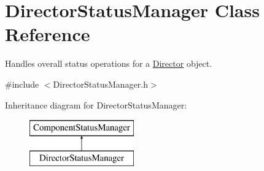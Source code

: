 \hypertarget{class_director_status_manager}{\section{Director\-Status\-Manager Class Reference}
\label{class_director_status_manager}
}


Handles overall status operations for a \hyperlink{class_director}{Director} object.  




{\ttfamily \#include $<$Director\-Status\-Manager.\-h$>$}

Inheritance diagram for Director\-Status\-Manager\-:\begin{figure}[H]
\begin{center}
\leavevmode
\includegraphics[height=2.000000cm]{class_director_status_manager}
\end{center}
\end{figure}
